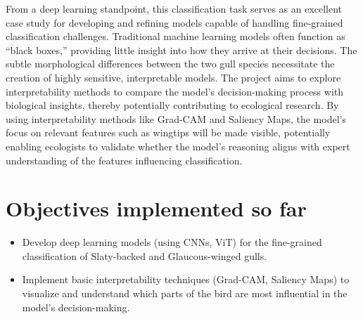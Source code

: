 From a deep learning standpoint, this classification task serves as an excellent case study for developing and refining models capable of handling fine-grained classification challenges. Traditional machine learning models often function as ``black boxes,'' providing little insight into how they arrive at their decisions. The subtle morphological differences between the two gull species necessitate the creation of highly sensitive, interpretable models. The project aims to explore interpretability methods to compare the model's decision-making process with biological insights, thereby potentially contributing to ecological research. By using interpretability methods like Grad-CAM and Saliency Maps, the model's focus on relevant features such as wingtips will be made visible, potentially enabling ecologists to validate whether the model's reasoning aligns with expert understanding of the features influencing classification.

\section*{Objectives implemented so far}
\begin{itemize}
    \item Develop deep learning models (using CNNs, ViT) for the fine-grained classification of Slaty-backed and Glaucous-winged gulls.
    \item Implement basic interpretability techniques (Grad-CAM, Saliency Maps) to visualize and understand which parts of the bird are most influential in the model's decision-making.
\end{itemize}
